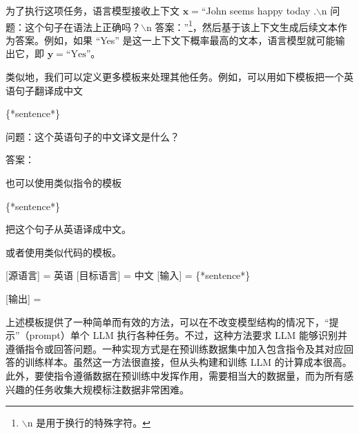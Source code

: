 为了执行这项任务，语言模型接收上下文 $\mathbf{x}=$``John seems happy today .$\backslash$n 问题：这个句子在语法上正确吗？$\backslash$n 答案：''\footnote{$\backslash$n 是用于换行的特殊字符。}，然后基于该上下文生成后续文本作为答案。例如，如果 ``Yes'' 是这一上下文下概率最高的文本，语言模型就可能输出它，即 $\mathbf{y} = \textrm{``Yes''}$。

类似地，我们可以定义更多模板来处理其他任务。例如，可以用如下模板把一个英语句子翻译成中文

\vspace{0.5em}
\begin{tcolorbox}
\hspace{4em} \{*sentence*\}

\hspace{4em} 问题：这个英语句子的中文译文是什么？

\hspace{4em} 答案：\underline{\hspace{2em}}
\end{tcolorbox}
\vspace{0.5em}

\noindent 也可以使用类似指令的模板

\vspace{0.5em}
\begin{tcolorbox}
\hspace{4em} \{*sentence*\}

\hspace{4em} 把这个句子从英语译成中文。

\hspace{4em} \underline{\hspace{2em}}
\end{tcolorbox}
\vspace{0.5em}

\noindent 或者使用类似代码的模板。

\vspace{0.5em}
\begin{tcolorbox}
\hspace{4em} [源语言] = 英语 [目标语言] = 中文 [输入] = \{*sentence*\}

\hspace{4em} [输出] = \underline{\hspace{2em}}
\end{tcolorbox}
\vspace{0.5em}

上述模板提供了一种简单而有效的方法，可以在不改变模型结构的情况下，“提示”（prompt）单个 LLM 执行各种任务。不过，这种方法要求 LLM 能够识别并遵循指令或回答问题。一种实现方式是在预训练数据集中加入包含指令及其对应回答的训练样本。虽然这一方法很直接，但从头构建和训练 LLM 的计算成本很高。此外，要使指令遵循数据在预训练中发挥作用，需要相当大的数据量，而为所有感兴趣的任务收集大规模标注数据非常困难。

